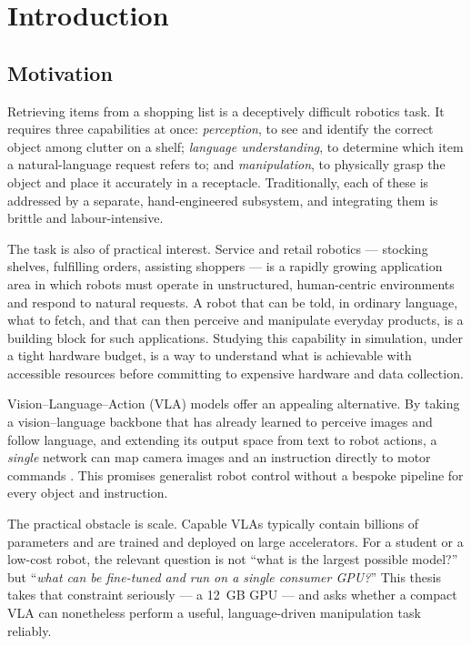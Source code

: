 \chapter{Introduction}
\label{chap:intro}

\section{Motivation}
\label{sec:motivation}
Retrieving items from a shopping list is a deceptively difficult robotics task.
It requires three capabilities at once: \emph{perception}, to see and identify
the correct object among clutter on a shelf; \emph{language understanding}, to
determine which item a natural-language request refers to; and
\emph{manipulation}, to physically grasp the object and place it accurately in a
receptacle. Traditionally, each of these is addressed by a separate, hand-engineered
subsystem, and integrating them is brittle and labour-intensive.

The task is also of practical interest. Service and retail robotics --- stocking
shelves, fulfilling orders, assisting shoppers --- is a rapidly growing application
area in which robots must operate in unstructured, human-centric environments and
respond to natural requests. A robot that can be told, in ordinary language, what to
fetch, and that can then perceive and manipulate everyday products, is a building
block for such applications. Studying this capability in simulation, under a tight
hardware budget, is a way to understand what is achievable with accessible resources
before committing to expensive hardware and data collection.

Vision--Language--Action (VLA) models offer an appealing alternative. By taking a
vision--language backbone that has already learned to perceive images and follow
language, and extending its output space from text to robot actions, a
\emph{single} network can map camera images and an instruction directly to motor
commands \parencite{zitkovich2023rt2, sapkota2026vla}. This promises generalist
robot control without a bespoke pipeline for every object and instruction.

The practical obstacle is scale. Capable VLAs typically contain billions of
parameters and are trained and deployed on large accelerators. For a student or a
low-cost robot, the relevant question is not ``what is the largest possible
model?'' but ``\emph{what can be fine-tuned and run on a single consumer GPU?}''
This thesis takes that constraint seriously --- a 12~GB GPU --- and asks whether a
compact VLA can nonetheless perform a useful, language-driven manipulation task
reliably.

